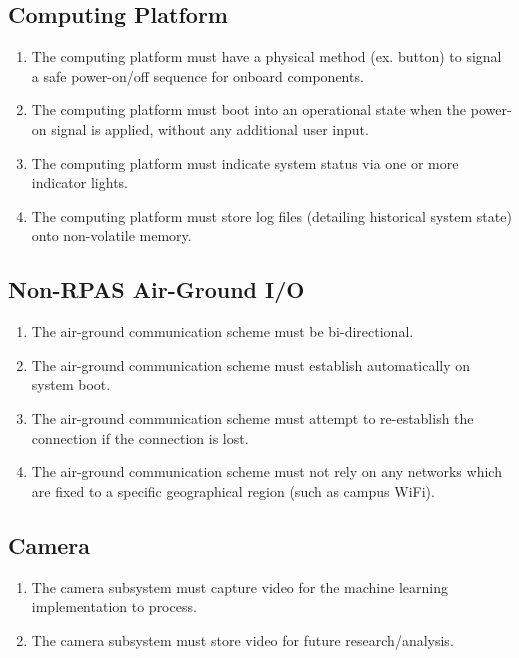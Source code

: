 \documentclass[10pt,letterpaper]{article}
\begin{document}
\subsection{Computing Platform}
\begin{enumerate}[label=F.CP.\arabic*, wide=1cm, widest=3cm, leftmargin=*, font=\bfseries, noitemsep,topsep=0pt, parsep=4pt, partopsep=0pt]
	\item The computing platform must have a physical method (ex. button) to signal a safe power-on/off sequence for onboard components.
	\item The computing platform must boot into an operational state when the power-on signal is applied, without any additional user input.
	\item The computing platform must indicate system status via one or more indicator lights.
	\item The computing platform must store log files (detailing historical system state) onto non-volatile memory.
\end{enumerate}

\subsection{Non-RPAS Air-Ground I/O}
\begin{enumerate}[label=F.CM.\arabic*, wide=1cm, widest=3cm, leftmargin=*, font=\bfseries, noitemsep,topsep=0pt, parsep=4pt, partopsep=0pt]
	\item The air-ground communication scheme must be bi-directional.
	\item The air-ground communication scheme must establish automatically on system boot.
	\item The air-ground communication scheme must attempt to re-establish the connection if the connection is lost.
	\item The air-ground communication scheme must not rely on any networks which are fixed to a specific geographical region (such as campus WiFi).
\end{enumerate}

\subsection{Camera}
\begin{enumerate}[label=F.CAM.\arabic*, wide=1cm, widest=3cm, leftmargin=*, font=\bfseries, noitemsep,topsep=0pt, parsep=4pt, partopsep=0pt]
	\item The camera subsystem must capture video for the machine learning implementation to process.
	\item The camera subsystem must store video for future research/analysis.
\end{enumerate}
\end{document}
